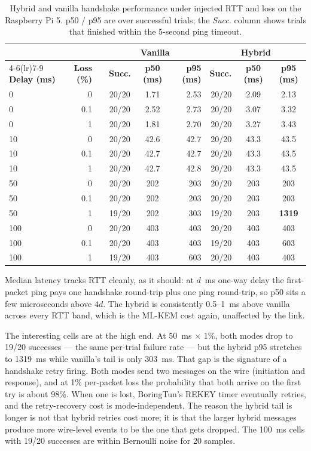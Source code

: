 \documentclass[11pt,a4paper]{article}
\begin{document}
\begin{table}[H]
\centering
\caption{Hybrid and vanilla handshake performance under injected RTT and loss on the Raspberry Pi 5. p50 / p95 are over successful trials; the \emph{Succ.} column shows trials that finished within the 5-second ping timeout.}
\label{tab:rtt_loss_matrix}
\small
\setlength{\tabcolsep}{5pt}
\begin{tabular}{@{}lrrccrrcc@{}}
\toprule
 & & & \multicolumn{3}{c}{Vanilla} & \multicolumn{3}{c}{Hybrid} \\
\cmidrule(lr){4-6}\cmidrule(lr){7-9}
\textbf{Delay (ms)} & \textbf{Loss (\%)} & & \textbf{Succ.} & \textbf{p50 (ms)} & \textbf{p95 (ms)} & \textbf{Succ.} & \textbf{p50 (ms)} & \textbf{p95 (ms)} \\
\midrule
0   & 0   && 20/20 &  1.71 &  2.53 & 20/20 &  2.09 &  2.13 \\
0   & 0.1 && 20/20 &  2.52 &  2.73 & 20/20 &  3.07 &  3.32 \\
0   & 1   && 20/20 &  1.81 &  2.70 & 20/20 &  3.27 &  3.43 \\
10  & 0   && 20/20 & 42.6  & 42.7  & 20/20 & 43.3  & 43.5  \\
10  & 0.1 && 20/20 & 42.7  & 42.7  & 20/20 & 43.3  & 43.5  \\
10  & 1   && 20/20 & 42.7  & 42.8  & 20/20 & 43.3  & 43.5  \\
50  & 0   && 20/20 & 202   & 203   & 20/20 & 203   & 203   \\
50  & 0.1 && 20/20 & 202   & 203   & 20/20 & 203   & 203   \\
50  & 1   && 19/20 & 202   & 303   & 19/20 & 203   & \textbf{1319} \\
100 & 0   && 20/20 & 403   & 403   & 20/20 & 403   & 403   \\
100 & 0.1 && 20/20 & 403   & 403   & 19/20 & 403   & 603   \\
100 & 1   && 19/20 & 403   & 603   & 20/20 & 403   & 403   \\
\bottomrule
\end{tabular}
\end{table}

Median latency tracks RTT cleanly, as it should: at $d$~ms one-way delay the first-packet ping pays one handshake round-trip plus one ping round-trip, so p50 sits a few microseconds above $4d$. The hybrid is consistently 0.5--1~ms above vanilla across every RTT band, which is the ML-KEM cost again, unaffected by the link.

The interesting cells are at the high end. At 50~ms $\times$ 1\%, both modes drop to 19/20 successes --- the same per-trial failure rate --- but the hybrid p95 stretches to 1319~ms while vanilla's tail is only 303~ms. That gap is the signature of a handshake retry firing. Both modes send two messages on the wire (initiation and response), and at 1\% per-packet loss the probability that both arrive on the first try is about 98\%. When one is lost, BoringTun's REKEY timer eventually retries, and the retry-recovery cost is mode-independent. The reason the hybrid tail is longer is not that hybrid retries cost more; it is that the larger hybrid messages produce more wire-level events to be the one that gets dropped. The 100~ms cells with 19/20 successes are within Bernoulli noise for 20 samples.
\end{document}
